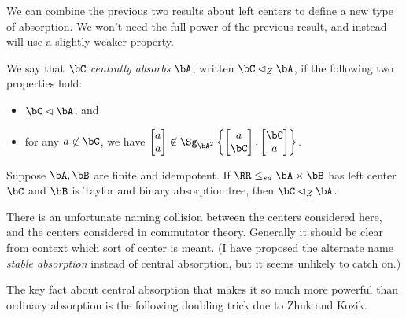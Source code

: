 We can combine the previous two results about left centers to define a new type of absorption. We won't need the full power of the previous result, and instead will use a slightly weaker property.

\begin{defn} We say that $\bC$ \emph{centrally absorbs} $\bA$, written $\bC \lhd_Z \bA$, if the following two properties hold:
\begin{itemize}
\item $\bC \lhd \bA$, and
\item for any $a \not\in \bC$, we have $\begin{bmatrix}a\\ a\end{bmatrix} \not\in \Sg_{\bA^2}\left\{\begin{bmatrix}a\\ \bC\end{bmatrix}, \begin{bmatrix}\bC\\ a\end{bmatrix}\right\}$.
\end{itemize}
\end{defn}

\begin{cor}\label{zhuk-center} Suppose $\bA, \bB$ are finite and idempotent. If $\RR \le_{sd} \bA \times \bB$ has left center $\bC$ and $\bB$ is Taylor and binary absorption free, then $\bC \lhd_Z \bA$.
\end{cor}

There is an unfortunate naming collision between the centers considered here, and the centers considered in commutator theory. Generally it should be clear from context which sort of center is meant. (I have proposed the alternate name \emph{stable absorption} instead of central absorption, but it seems unlikely to catch on.)

The key fact about central absorption that makes it so much more powerful than ordinary absorption is the following doubling trick due to Zhuk and Kozik.


